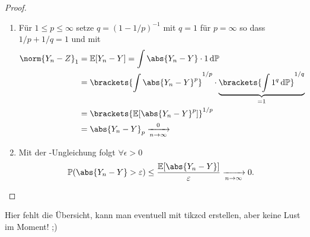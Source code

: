 \begin{proof}
	\begin{enumerate}
		\item Für $1 \le p \le \infty$ setze $q = (1- 1/p)^{-1}$ mit $q = 1$ für $p = \infty$ so dass $1/p + 1/q = 1$ und mit 
		\begin{align*}
			\norm{Y_n-Z}_1 &= \E[Y_n-Y] = \int \abs{Y_n-Y}\cdot 1 \d \P\\
			&= \brackets{\int \abs{Y_n -Y}^p}^{1/p} \cdot \underbrace{\brackets{\int 1^q \d \P}^{1/q}}_{=1}\\
			&= \brackets{\E[\abs{Y_n -Y}^p]}^{1/p}\\
			&= \abs{Y_n - Y}_p \xrightarrow[n \to \infty] 0
		\end{align*}
		\item Mit der -Ungleichung folgt $\forall \epsilon > 0$
		\begin{align*}
			\P(\abs{Y_n - Y} > \epsilon) \le \frac{\E[\abs{Y_n - Y}]}{\epsilon} \xrightarrow[n \to \infty]{} 0.
		\end{align*}
	\end{enumerate}
\end{proof}
Hier fehlt die Übersicht, kann man eventuell mit tikzcd erstellen, aber keine Lust im Moment! ;)
